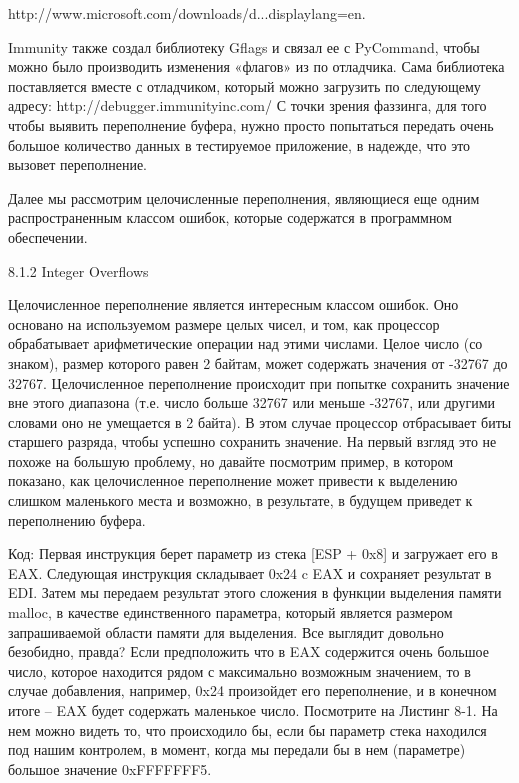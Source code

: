 \documentclass[12pt, a4paper, oneside]{book}
\begin{document}
http://www.microsoft.com/downloads/d...displaylang=en.

Immunity также создал библиотеку Gflags и связал ее с PyCommand, чтобы можно было производить изменения «флагов» из по отладчика. Сама библиотека поставляется вместе с отладчиком, который можно загрузить по следующему адресу: http://debugger.immunityinc.com/
С точки зрения фаззинга, для того чтобы выявить переполнение буфера, нужно просто попытаться передать очень большое количество данных в тестируемое приложение, в надежде, что это вызовет переполнение. 

Далее мы рассмотрим целочисленные переполнения, являющиеся еще одним распространенным классом ошибок, которые содержатся в программном обеспечении.

8.1.2 Integer Overflows

Целочисленное переполнение является интересным классом ошибок. Оно основано на используемом размере целых чисел, и том, как процессор обрабатывает арифметические операции над этими числами. Целое число (со знаком), размер которого равен 2 байтам, может содержать значения от -32767 до 32767. Целочисленное переполнение происходит при попытке сохранить значение вне этого диапазона (т.е. число больше 32767 или меньше -32767, или другими словами оно не умещается в 2 байта). В этом случае процессор отбрасывает биты старшего разряда, чтобы успешно сохранить значение. На первый взгляд это не похоже на большую проблему, но давайте посмотрим пример, в котором показано, как целочисленное переполнение может привести к выделению слишком маленького места и возможно, в результате, в будущем приведет к переполнению буфера.

Код:
Первая инструкция берет параметр из стека [ESP + 0x8] и загружает его в EAX. Следующая инструкция складывает 0x24 c EAX и сохраняет результат в EDI. Затем мы передаем результат этого сложения в функции выделения памяти malloc, в качестве единственного параметра, который является размером запрашиваемой области памяти для выделения. Все выглядит довольно безобидно, правда? Если предположить что в EAX содержится очень большое число, которое находится рядом с максимально возможным значением, то в случае добавления, например, 0x24 произойдет его переполнение, и в конечном итоге – EAX будет содержать маленькое число. Посмотрите на Листинг 8-1. На нем можно видеть то, что происходило бы, если бы параметр стека находился под нашим контролем, в момент, когда мы передали бы в нем (параметре) большое значение 0xFFFFFFF5.
\end{document}
